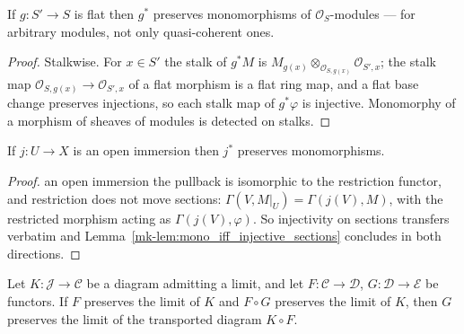 \begin{lemma}
  \label{mk-lem:pullback_preserves_monos}

  If \(g : S' \to S\) is flat then \(g^*\) preserves monomorphisms of
  \(\mathcal{O}_S\)-modules --- for arbitrary modules, not only quasi-coherent ones.
\end{lemma}

\begin{proof}
  Stalkwise. For \(x \in S'\) the stalk of \(g^* M\) is
  \(M_{g(x)} \otimes_{\mathcal{O}_{S, g(x)}} \mathcal{O}_{S', x}\); the stalk map
  \(\mathcal{O}_{S, g(x)} \to \mathcal{O}_{S', x}\) of a flat morphism is a flat ring map, and a
  flat base change preserves injections, so each stalk map of \(g^* \varphi\) is injective.
  Monomorphy of a morphism of sheaves of modules is detected on stalks.
\end{proof}

\begin{lemma}\label{mk-lem:pullback_preserves_monos_openImmersion}
  \leanok

  If \(j : U \to X\) is an open immersion then \(j^*\) preserves monomorphisms.
\end{lemma}

\begin{proof}
  \leanokAlong an open immersion the pullback is isomorphic to the restriction functor, and restriction
  does not move sections: \(\Gamma(V, M|_U) = \Gamma(j(V), M)\), with the restricted morphism
  acting as \(\Gamma(j(V), \varphi)\). So injectivity on sections transfers verbatim and
  Lemma~\ref{mk-lem:mono_iff_injective_sections} concludes in both directions.
\end{proof}

\begin{lemma}\label{mk-lem:preserves_limit_comp_cancel}
  \leanok

  Let \(K : \mathcal{J} \to \mathcal{C}\) be a diagram admitting a limit, and let
  \(F : \mathcal{C} \to \mathcal{D}\), \(G : \mathcal{D} \to \mathcal{E}\) be functors. If \(F\)
  preserves the limit of \(K\) and \(F \circ G\) preserves the limit of \(K\), then \(G\)
  preserves the limit of the transported diagram \(K \circ F\).
\end{lemma}

